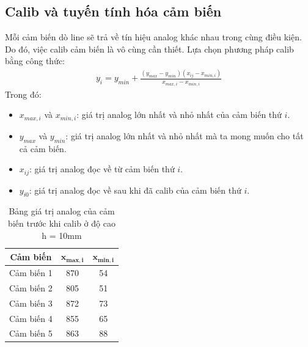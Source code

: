         \subsection{Calib và tuyến tính hóa cảm biến}
            \hspace*{0.6cm}Mỗi cảm biến dò line sẽ trả về tín hiệu analog khác nhau trong cùng điều kiện. Do đó, việc calib cảm biến là vô cùng cần thiết. Lựa chọn phương pháp calib bằng công thức:
            \begin{align}
                y_i = y_{min} + \frac{(y_{max} - y_{min})(x_{ij} - x_{min, i})}{x_{max, i} - x_{min, i}} 
                \label{eq:4-6}
            \end{align}
            Trong đó:
            \begin{itemize}
                \item $x_{max,i}$ và $x_{min,i}$: giá trị analog lớn nhất và nhỏ nhất của cảm biến thứ $i$.
                \item $y_{max}$ và $y_{min}$: giá trị analog lớn nhất và nhỏ nhất mà ta mong muốn cho tất cả cảm biến.
                \item $x_{ij}$: giá trị analog đọc về từ cảm biến thứ $i$.
                \item $y_{i0}$: giá trị analog đọc về sau khi đã calib của cảm biến thứ $i$.
            \end{itemize}
            \begin{table}[H]
                \centering
                \begin{tabular}{|c|c|c|}
                    \hline
                    \textbf{Cảm biến} & $\mathbf{x_{max,i}}$ & $\mathbf{x_{min,i}}$  \\
                    \hline
                    Cảm biến 1 & 870 & 54  \\
                    \hline
                    Cảm biến 2 & 805 & 51  \\
                    \hline
                    Cảm biến 3 & 872 & 73  \\
                    \hline
                    Cảm biến 4 & 855 & 65  \\
                    \hline
                    Cảm biến 5 & 863 & 88  \\
                    \hline
                \end{tabular}
                \caption{Bảng giá trị analog của cảm biến trước khi calib ở độ cao h = 10mm}
                \label{tab:4-3}
            \end{table}
